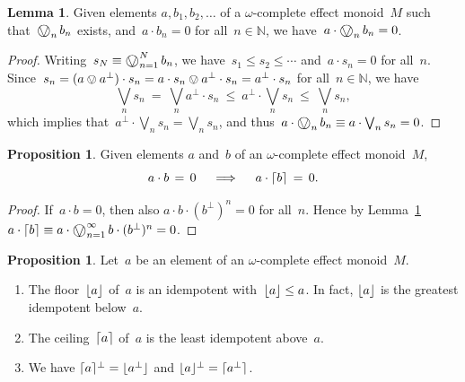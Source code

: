 \documentclass[10pt,conference]{IEEEtran}
\DeclarePairedDelimiter{\ceil}{\lceil}{\rceil}
\DeclarePairedDelimiter{\floor}{\lfloor}{\rfloor}
\newcommand{\N}{\mathbb{N}}
\newcounter{counter}
\theoremstyle{definition}
\newtheorem{proposition}[counter]{Proposition}
\newtheorem{lemma}[counter]{Lemma}
\newcommand{\bigovee}{\mathop{\vphantom{\sum}\mathchoice%
        {\vcenter{\hbox{\huge $\ovee$}}}%
        {\vcenter{\hbox{\Large $\ovee$}}}%
        {\ovee}{\ovee}}\displaylimits}
\begin{document}
\begin{lemma}
\label{lem:zerodivsum}
Given elements $a, b_1, b_2,\dotsc$
of a $\omega$-complete effect monoid~$M$
such that~$\bigovee_n b_n$ exists,
and~$a\cdot b_n=0$ for all~$n\in \N$,
we have~$a \cdot \bigovee_n b_n=0$.
\end{lemma}
\begin{proof}
    Writing~$s_N\equiv\bigovee_{n=1}^N b_n$,
    we have~$s_1\leq s_2\leq \dotsb$
    and~$a\cdot s_n=0$ for all~$n$.
    Since~$s_n=(a\ovee a^\perp)\cdot s_n
    = a \cdot s_n \ovee a^\perp \cdot s_n = a^\perp \cdot s_n$
    for all~$n \in \N$,
    we have
\begin{equation*}
    \textstyle \bigvee_n s_n \ = \ \bigvee_n a^\perp \cdot s_n
    \ \leq\  a^\perp \cdot \bigvee_n s_n
    \ \leq\  \bigvee_n s_n,
\end{equation*}
which implies that~$a^\perp\cdot \bigvee_ns_n= \bigvee_n s_n$,
and thus~$a\cdot \bigovee_n b_n \equiv a \cdot \bigvee_n s_n=0$.
\end{proof}
\begin{proposition}
\label{prop:ceilprod}
Given elements $a$ and~$b$ of an $\omega$-complete effect monoid~$M$,
$$
    a\cdot b\,=\,0\quad\implies\quad a\cdot\ceil{b}\,=\,0.
$$
\end{proposition}
\begin{proof}
If~$a\cdot b=0$,
then also $a\cdot b\cdot (b^\perp)^n=0$
    for all~$n$.
Hence by Lemma~\ref{lem:zerodivsum}
$a\cdot \ceil{b}\equiv a\cdot \bigovee_{n=1}^\infty b\cdot (b^\perp)^n
    =0$.
\end{proof}
\begin{proposition}
\label{prop:ceilfloor}
Let~$a$ be an element of an $\omega$-complete
effect monoid~$M$.
\begin{enumerate}
\item
    \label{prop:ceilfloor-floor}
The floor~$\floor{a}$ of~$a$
        is an idempotent with~$\floor{a}\leq a$.
        In fact, $\floor{a}$
        is the greatest idempotent below~$a$.
\item
    \label{prop:ceilfloor-ceil}
The ceiling~$\ceil{a}$ of~$a$
is the least idempotent above~$a$.
\item
    \label{prop:ceilfloor-duality}
    We have
        $\ceil{a}^\perp = \floor{a^\perp}$
        and
        $\floor{a}^\perp = \ceil{a^\perp}$.
\end{enumerate}
\end{proposition}
\end{document}
